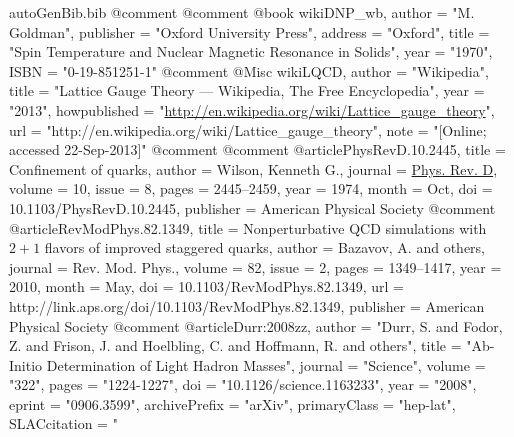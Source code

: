 \begin{filecontents*}{autoGenBib.bib}
@comment %
@comment %
@book{ wikiDNP_wb,
	author = "M. Goldman",
	publisher = "Oxford University Press",
	address = "Oxford",
	title = "Spin Temperature and Nuclear Magnetic Resonance in Solids",
	year = "1970",
	ISBN = "0-19-851251-1"
}
@comment %
@Misc{ wikiLQCD,
  author = "Wikipedia",
  title = "Lattice Gauge Theory --- {W}ikipedia{,} The Free Encyclopedia",
  year = "2013",
  howpublished = "\url{http://en.wikipedia.org/wiki/Lattice_gauge_theory}",
  url = "http://en.wikipedia.org/wiki/Lattice_gauge_theory",
  note = "[Online; accessed 22-Sep-2013]"
}
@comment %
@comment %
@article{PhysRevD.10.2445,
  title = {Confinement of quarks},
  author = {Wilson, Kenneth G.},
  journal = {\href{http://link.aps.org/doi/10.1103/PhysRevD.10.2445}{Phys. Rev. D}},
  volume = {10},
  issue = {8},
  pages = {2445--2459},
  year = {1974},
  month = {Oct},
  doi = {10.1103/PhysRevD.10.2445},
  publisher = {American Physical Society}
}
@comment %
@article{RevModPhys.82.1349,
  title = {Nonperturbative QCD simulations with $2+1$ flavors of improved staggered quarks},
  author = {Bazavov, A. and others},
  journal = {Rev. Mod. Phys.},
  volume = {82},
  issue = {2},
  pages = {1349--1417},
  year = {2010},
  month = {May},
  doi = {10.1103/RevModPhys.82.1349},
  url = {http://link.aps.org/doi/10.1103/RevModPhys.82.1349},
  publisher = {American Physical Society}
}
@comment %
@article{Durr:2008zz,
      author         = "Durr, S. and Fodor, Z. and Frison, J. and Hoelbling, C.
                        and Hoffmann, R. and others",
      title          = "{Ab-Initio Determination of Light Hadron Masses}",
      journal        = "Science",
      volume         = "322",
      pages          = "1224-1227",
      doi            = "10.1126/science.1163233",
      year           = "2008",
      eprint         = "0906.3599",
      archivePrefix  = "arXiv",
      primaryClass   = "hep-lat",
      SLACcitation   = "%
}


\end{filecontents*}
